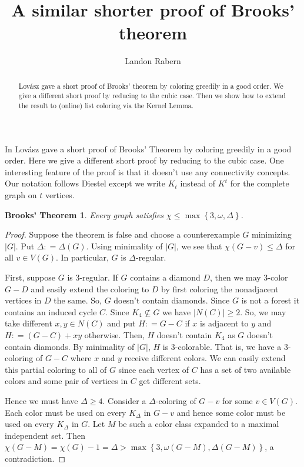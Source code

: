 \documentclass[12pt]{amsart}
\title{A similar shorter proof of Brooks' theorem}
\author{Landon Rabern}
\theoremstyle{plain}
\newtheorem*{Brooks}{Brooks' Theorem}
\theoremstyle{definition}
\theoremstyle{remark}
\newcommand{\set}[1]{\left\{ #1 \right\}}
\newcommand{\card}[1]{\left|#1\right|}
\newcommand{\DefinedAs}{\mathrel{\mathop:}=}
\begin{document}
\begin{abstract}
Lov\'{a}sz gave a short proof of Brooks' theorem by coloring greedily in a good
order. We give a different short proof by reducing to the cubic case.  Then we show how to extend the result to (online) list coloring via the Kernel Lemma.
\end{abstract}
\maketitle
In \cite{Lovasz1975269} Lov\'{a}sz gave a short proof of Brooks' Theorem \cite{brooks1941colouring} by
coloring greedily in a good order. Here we give a different short proof by reducing to the cubic case.  One
interesting feature of the proof is that it doesn't use any connectivity
concepts. Our notation follows Diestel \cite{Diestel} except we write $K_t$ instead of $K^t$ for the complete graph on $t$ vertices. 

\begin{Brooks}
Every graph satisfies $\chi \leq \max\set{3, \omega, \Delta}$.
\end{Brooks}
\begin{proof}
Suppose the theorem is false and choose a counterexample $G$ minimizing
$\card{G}$.  Put $\Delta \DefinedAs \Delta(G)$. Using minimality of $\card{G}$,
we see that $\chi(G - v) \leq \Delta$ for all $v \in
V(G)$. In particular, $G$ is $\Delta$-regular.

First, suppose $G$ is $3$-regular.  If $G$ contains a diamond $D$, then we may $3$-color $G-D$ and easily extend the coloring to $D$ by first coloring the nonadjacent vertices in $D$ the same.  So, $G$ doesn't contain diamonds. Since $G$ is not a forest it contains an induced cycle $C$. Since $K_4 \not
\subseteq G$ we have $\card{N(C)} \geq 2$. So, we may take different $x, y \in N(C)$ and put $H \DefinedAs G - C$ if $x$ is adjacent to $y$ and $H \DefinedAs (G-C) + xy$ otherwise.  Then, $H$ doesn't contain $K_4$ as $G$ doesn't contain diamonds. By minimality of $\card{G}$, $H$ is $3$-colorable. That is, we have a $3$-coloring of $G - C$ where $x$ and $y$ receive different colors.  We can easily extend this partial
coloring to all of $G$ since each vertex of $C$ has a set of two available
colors and some pair of vertices in $C$ get different sets.  

Hence we must have $\Delta \geq 4$. Consider a $\Delta$-coloring of $G-v$ for some $v \in V(G)$.  Each color must be used on every $K_{\Delta}$ in $G-v$ and hence some color must be used on every $K_{\Delta}$ in $G$.  Let $M$ be such a color class expanded to a maximal independent set.  Then $\chi(G-M) = \chi(G) - 1 = \Delta > \max\set{3, \omega(G-M), \Delta(G-M)}$, a contradiction.
\end{proof}
\end{document}
